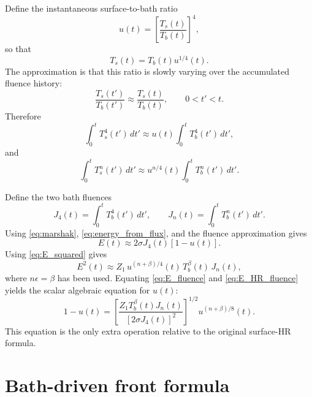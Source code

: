 \documentclass[11pt]{article}
\newcommand{\Tb}{T_b}
\newcommand{\Ts}{T_s}
\newcommand{\eps}{\epsilon}
\newcommand{\dif}{\,d}
\newcommand{\Jfour}{J_4}
\newcommand{\Jn}{J_n}
\begin{document}
Define the instantaneous surface-to-bath ratio
\begin{equation}
 \boxed{
 u(t)=\left[\frac{\Ts(t)}{\Tb(t)}\right]^4,}
 \label{eq:u_def}
\end{equation}
so that
\begin{equation}
 \boxed{
 \Ts(t)=\Tb(t)u^{1/4}(t).}
 \label{eq:Ts_from_u}
\end{equation}
The approximation is that this ratio is slowly varying over the accumulated
fluence history:
\begin{equation}
 \boxed{
 \frac{\Ts(t')}{\Tb(t')}\approx \frac{\Ts(t)}{\Tb(t)},
 \qquad 0<t'<t.}
 \label{eq:fluence_approx}
\end{equation}
Therefore
\begin{equation}
 \int_0^t\Ts^4(t')\dif t'\approx u(t)\int_0^t\Tb^4(t')\dif t',
\end{equation}
and
\begin{equation}
 \int_0^t\Ts^n(t')\dif t'\approx u^{n/4}(t)\int_0^t\Tb^n(t')\dif t'.
\end{equation}

Define the two bath fluences
\begin{equation}
 \boxed{
 \Jfour(t)=\int_0^t\Tb^4(t')\dif t',
 \qquad
 \Jn(t)=\int_0^t\Tb^n(t')\dif t'.}
 \label{eq:fluences}
\end{equation}
Using \eqref{eq:marshak}, \eqref{eq:energy_from_flux}, and the fluence
approximation gives
\begin{equation}
 E(t)\approx 2\sigma\Jfour(t)\left[1-u(t)\right].
 \label{eq:E_fluence}
\end{equation}
Using \eqref{eq:E_squared} gives
\begin{equation}
 E^2(t)\approx Z_1\,u^{(n+\beta)/4}(t)\,\Tb^\beta(t)\,\Jn(t),
 \label{eq:E_HR_fluence}
\end{equation}
where $n\eps=\beta$ has been used.
Equating \eqref{eq:E_fluence} and \eqref{eq:E_HR_fluence} yields the scalar
algebraic equation for $u(t)$:
\begin{equation}
 \boxed{
 1-u(t)
 =
 \left[
 \frac{Z_1\Tb^\beta(t)\Jn(t)}{\left[2\sigma\Jfour(t)\right]^2}
 \right]^{1/2}
 u^{(n+\beta)/8}(t).}
 \label{eq:u_equation}
\end{equation}
This equation is the only extra operation relative to the original surface-HR
formula.

\section{Bath-driven front formula}
\end{document}

